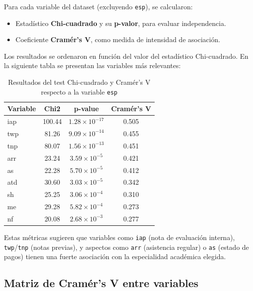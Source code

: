 \documentclass[11pt,a4paper]{article}
\begin{document}
\medskip

Para cada variable del dataset (excluyendo \texttt{esp}), se calcularon:

\begin{itemize}
    \item Estadístico \textbf{Chi-cuadrado} y su \textbf{p-valor}, para evaluar independencia.
    \item Coeficiente \textbf{Cramér’s V}, como medida de intensidad de asociación.
\end{itemize}

\medskip

Los resultados se ordenaron en función del valor del estadístico Chi-cuadrado. En la siguiente tabla se presentan las variables más relevantes:

\begin{table}[H]
\centering
\small
\begin{tabular}{lccc}
\toprule
\textbf{Variable} & \textbf{Chi2} & \textbf{p-value} & \textbf{Cramér's V} \\
\midrule
iap   & 100.44 & $1.28\times10^{-17}$ & 0.505 \\
twp   & 81.26  & $9.09\times10^{-14}$ & 0.455 \\
tnp   & 80.07  & $1.56\times10^{-13}$ & 0.451 \\
arr   & 23.24  & $3.59\times10^{-5}$  & 0.421 \\
as    & 22.28  & $5.70\times10^{-5}$  & 0.412 \\
atd   & 30.60  & $3.03\times10^{-5}$  & 0.342 \\
sh    & 25.25  & $3.06\times10^{-4}$  & 0.310 \\
me    & 29.28  & $5.82\times10^{-4}$  & 0.273 \\
nf    & 20.08  & $2.68\times10^{-3}$  & 0.277 \\
\bottomrule
\end{tabular}
\caption*{Resultados del test Chi-cuadrado y Cramér's V respecto a la variable \texttt{esp}}
\end{table}

\medskip

Estas métricas sugieren que variables como \texttt{iap} (nota de evaluación interna), \texttt{twp}/\texttt{tnp} (notas previas), y aspectos como \texttt{arr} (asistencia regular) o \texttt{as} (estado de pagos) tienen una fuerte asociación con la especialidad académica elegida.

\subsection{Matriz de Cramér's V entre variables}
\end{document}
